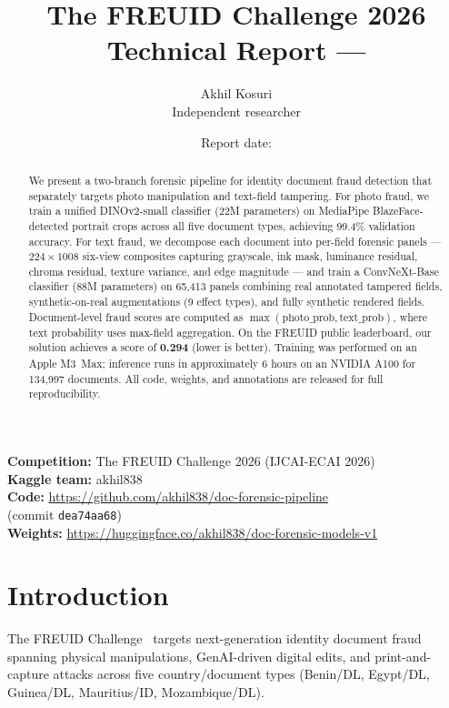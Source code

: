 \documentclass[11pt,a4paper]{article}
\title{%
  \textbf{The FREUID Challenge 2026}\\[0.4em]
  \large Technical Report --- \teamname
}
\author{%
  Akhil Kosuri\\
  \small Independent researcher\\
  \texttt{\contactemail}
}
\date{Report date: \reportdate}
\newcommand{\kaggleteam}{akhil838}
\begin{document}
\maketitle
\sloppy

\begin{abstract}
We present a two-branch forensic pipeline for identity document fraud detection
that separately targets photo manipulation and text-field tampering.
For photo fraud, we train a unified DINOv2-small classifier (22M parameters) on
MediaPipe BlazeFace-detected portrait crops across all five document types, achieving 99.4\%
validation accuracy.
For text fraud, we decompose each document into per-field forensic panels ---
$224 \times 1008$ six-view composites capturing grayscale, ink mask, luminance
residual, chroma residual, texture variance, and edge magnitude --- and train
a ConvNeXt-Base classifier (88M parameters) on 65{,}413 panels combining real
annotated tampered fields, synthetic-on-real augmentations (9 effect types), and
fully synthetic rendered fields.
Document-level fraud scores are computed as $\max(\text{photo\_prob}, \text{text\_prob})$,
where text probability uses max-field aggregation.
On the FREUID public leaderboard, our solution achieves a score of \textbf{0.294}
(lower is better). Training was performed on an Apple M3~Max;
inference runs in approximately 6 hours on an NVIDIA A100 for 134{,}997 documents.
All code, weights, and annotations are released for full reproducibility.
\end{abstract}

\noindent\textbf{Competition:} The FREUID Challenge 2026 (IJCAI-ECAI 2026)\\
\textbf{Kaggle team:} \kaggleteam\\
\textbf{Code:} \url{https://github.com/akhil838/doc-forensic-pipeline}\\
\hspace*{1.5cm}(commit \texttt{dea74aa68})\\
\textbf{Weights:} \url{https://huggingface.co/akhil838/doc-forensic-models-v1}\\
\section{Introduction}
\label{sec:intro}

The FREUID Challenge~\cite{freuid2026} targets next-generation identity document
fraud spanning physical manipulations, GenAI-driven digital edits, and
print-and-capture attacks across five country/document types
(Benin/DL, Egypt/DL, Guinea/DL, Mauritius/ID, Mozambique/DL).
\end{document}
